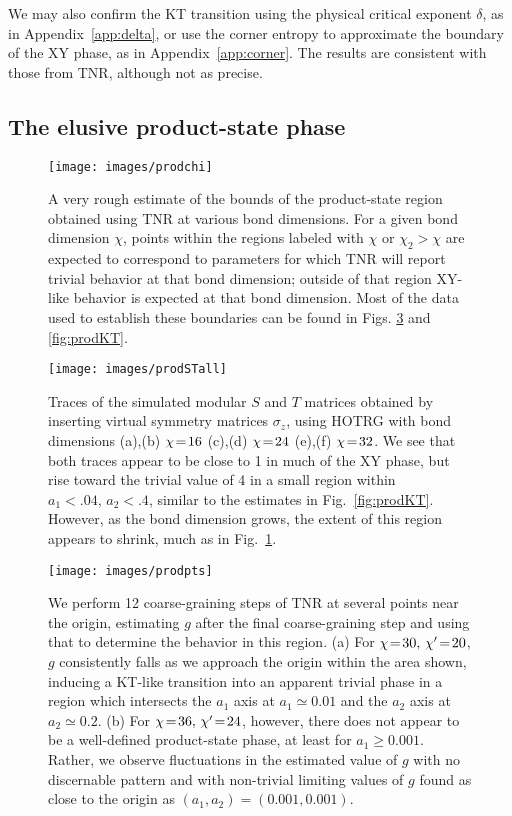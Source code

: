 \documentclass[aps,prb,letterpaper,superscriptaddress,twocolumn,showpacs,floatfix,10pt]{revtex4-1}
\begin{document}
We may also confirm the KT transition using the physical critical
exponent $\delta$, as in Appendix~\ref{app:delta}, or 
use the corner entropy to approximate the boundary of the XY
phase, as in Appendix~\ref{app:corner}.  The results are consistent with those
from TNR, although not as precise.

\subsection{The elusive product-state phase}
\label{sec:prodstate}
\begin{figure}[h!]
\texttt{[image: images/prodchi]}
\caption{A very rough estimate of the bounds of the product-state region
obtained using TNR at various bond dimensions. For a given bond dimension
$\chi$, points within the regions labeled with $\chi$ or $\chi_2>\chi$
are expected to correspond to parameters for which TNR will report trivial
behavior at that bond dimension; outside of that region XY-like behavior
is expected at that bond dimension. Most of the data used to
establish these boundaries can be found in Figs. \ref{fig:prodpts} and
\ref{fig:prodKT}.}
\label{fig:prodchi}
\end{figure}

\begin{figure}[h!]
\centering
\texttt{[image: images/prodSTall]}
\caption{Traces of the simulated modular $S$ and $T$ matrices obtained by
inserting virtual symmetry matrices
$\sigma_z$, using HOTRG with bond dimensions
(a),(b) $\chi\nobreak\!=\nobreak\!16$ (c),(d) $\chi\nobreak\!=\nobreak\!24$ (e),(f) $\chi\nobreak\!=\nobreak\!32$. We see that both traces
appear to be
close to 1 in much of the XY phase, but rise toward the trivial value of
4 in a small region within $a_1\!<\!.04, \,a_2\!<\!.4$, similar to
the estimates in Fig.~\ref{fig:prodKT}. However, as the bond dimension grows,
the extent of this region appears to shrink, much as in Fig.~\ref{fig:prodchi}.}
\label{fig:prodST}
\end{figure}

\begin{figure}[h!]
\texttt{[image: images/prodpts]}
\caption{We perform 12 coarse-graining steps of TNR at several points near
the origin, estimating $g$ after the final coarse-graining step and using
that to determine the behavior in this region. (a) For $\chi\nobreak\!=\nobreak\!30, \,\chi'\nobreak\!=\nobreak\!20$,
$g$ consistently falls as we approach the origin within the area shown,
inducing a KT-like transition into an apparent trivial phase in a region
which intersects the $a_1$ axis at $a_1 \simeq 0.01$ and the $a_2$ axis at
$a_2 \simeq 0.2$. (b) For $\chi\nobreak\!=\nobreak\!36, \,\chi'\nobreak\!=\nobreak\!24$, however, there does not
appear to be a well-defined product-state phase, at least for $a_1\geq 0.001$.
Rather, we observe fluctuations in the estimated value of $g$ with no
discernable pattern and with non-trivial limiting values of $g$ found
as close to the origin as $(a_1,a_2) = (0.001,0.001)$.}
\label{fig:prodpts}
\end{figure}
\end{document}
